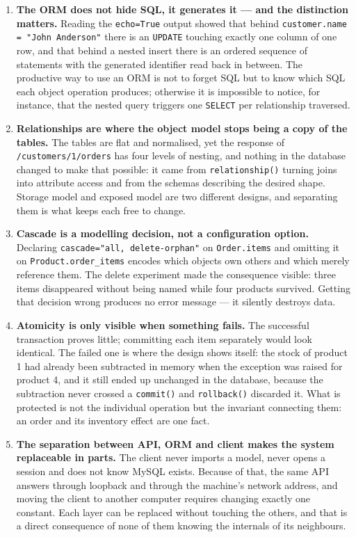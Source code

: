 \documentclass[10pt,a4paper]{article}
\begin{document}
\begin{enumerate}[leftmargin=0.7cm]

\item \textbf{The ORM does not hide SQL, it generates it --- and the distinction
matters.} Reading the \texttt{echo=True} output showed that behind
\texttt{customer.name = "John Anderson"} there is an \texttt{UPDATE} touching
exactly one column of one row, and that behind a nested insert there is an
ordered sequence of statements with the generated identifier read back in
between. The productive way to use an ORM is not to forget SQL but to know which
SQL each object operation produces; otherwise it is impossible to notice, for
instance, that the nested query triggers one \texttt{SELECT} per relationship
traversed.

\item \textbf{Relationships are where the object model stops being a copy of the
tables.} The tables are flat and normalised, yet the response of
\texttt{/customers/1/orders} has four levels of nesting, and nothing in the
database changed to make that possible: it came from \texttt{relationship()}
turning joins into attribute access and from the schemas describing the desired
shape. Storage model and exposed model are two different designs, and separating
them is what keeps each free to change.

\item \textbf{Cascade is a modelling decision, not a configuration option.}
Declaring \texttt{cascade="all, delete-orphan"} on \texttt{Order.items} and
omitting it on \texttt{Product.order\_items} encodes which objects own others
and which merely reference them. The delete experiment made the consequence
visible: three items disappeared without being named while four products
survived. Getting that decision wrong produces no error message --- it silently
destroys data.

\item \textbf{Atomicity is only visible when something fails.} The successful
transaction proves little; committing each item separately would look identical.
The failed one is where the design shows itself: the stock of product 1 had
already been subtracted in memory when the exception was raised for product 4,
and it still ended up unchanged in the database, because the subtraction never
crossed a \texttt{commit()} and \texttt{rollback()} discarded it. What is
protected is not the individual operation but the invariant connecting them: an
order and its inventory effect are one fact.

\item \textbf{The separation between API, ORM and client makes the system
replaceable in parts.} The client never imports a model, never opens a session
and does not know MySQL exists. Because of that, the same API answers through
loopback and through the machine's network address, and moving the client to
another computer requires changing exactly one constant. Each layer can be
replaced without touching the others, and that is a direct consequence of none
of them knowing the internals of its neighbours.

\end{enumerate}
\end{document}
